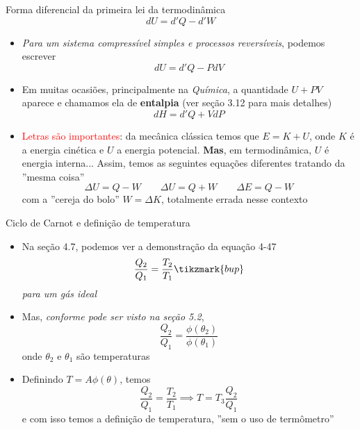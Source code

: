 \documentclass[t,%
brazilian,%
11pt,%
aspectratio=169,%
table%
]{beamer}
\begin{document}
\begin{frame}{Forma diferencial da primeira lei da termodinâmica}
    \[
        \boxed{dU = d'Q - d'W}
    \]
\begin{itemize}
    \item \textit{Para um sistema compressível simples e processos reversíveis}, podemos escrever
        \[
            dU=d'Q-PdV
        \]
    \item Em muitas ocasiões, principalmente na \textit{Química}, a quantidade
        \(U+PV\) aparece e chamamos ela de \textbf{entalpia} (ver seção 3.12 para mais detalhes)
        \[
            dH = d'Q+VdP
        \]
    \item \textcolor{red}{Letras são importantes}: da mecânica clássica temos que \(E=K+U\), onde \(K\)
        é a energia cinética e \(U\) a energia potencial. \textbf{Mas}, em termodinâmica, \(U\) é
        energia interna... Assim, temos as seguintes equações diferentes tratando da ''mesma coisa''
        \[
            \Delta U = Q-W \qquad \Delta U = Q+W \qquad \Delta E = Q - W
        \]
        com a ''cereja do bolo'' \(W=\Delta K\), totalmente errada nesse contexto
\end{itemize}
\end{frame}

\begin{frame}{Ciclo de Carnot e definição de temperatura}
    \begin{itemize}
        \item Na seção 4.7, podemos ver a demonstração da equação 4-47
            \[
                \frac{Q_2}{Q_1} = \frac{T_2}{T_1} \tikzmark{bup}
            \]
            \textit{para um gás ideal}
        \item Mas, \textit{conforme pode ser visto na seção 5.2}, 
            \[
                \frac{Q_2}{Q_1} = \frac{\phi(\theta_2)}{\phi(\theta_1)}
            \]
            onde \(\theta_2\) e \(\theta_1\) são temperaturas
        \item Definindo \(T=A\phi(\theta)\), temos
            \[
                \frac{Q_2}{Q_1} = \frac{T_2}{T_1} \implies T=T_3 \frac{Q_2}{Q_1}
            \]
            e com isso temos a definição de temperatura, ''sem o uso de termômetro'' 

    \end{itemize}
\end{frame}
\end{document}
